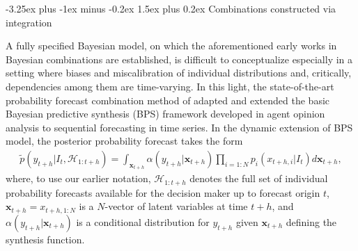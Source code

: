 \documentclass[11pt]{article}
\makeatletter
\renewcommand{\paragraph}{\@startsection{paragraph}{4}{0ex}%
   {-3.25ex plus -1ex minus -0.2ex}%
   {1.5ex plus 0.2ex}%
   {\normalfont\normalsize\bfseries}}
\makeatother
\begin{document}
\paragraph{Combinations constructed via integration}

A fully specified Bayesian model, on which the aforementioned early works in Bayesian combinations are established, is difficult to conceptualize especially in a setting where biases and miscalibration of individual distributions and, critically, dependencies among them are time-varying. In this light, the state-of-the-art probability forecast combination method of \citet{McAlinn2019-kn} adapted and extended the basic Bayesian predictive synthesis (BPS) framework developed in agent opinion analysis \citep[see, e.g.,][]{Genest1985-bu,West1992-qy,West1992-gr} to sequential forecasting in time series. In the dynamic extension of BPS model, the posterior probability forecast takes the form
\begin{align*}
\tilde{p}\left(y_{t+h} | I_{t}, \mathcal{H}_{1: t+h}\right) = \int_{\boldsymbol{x}_{t+h}} \alpha\left(y_{t+h} | \boldsymbol{x}_{t+h}\right) \prod_{i=1: N} p_{i}\left(x_{t+h,i}|I_{t}\right) d \boldsymbol{x}_{t+h},
\end{align*}
where, to use our earlier notation, $\mathcal{H}_{1: t+h}$ denotes the full set of individual probability forecasts available for the decision maker up to forecast origin $t$, $\boldsymbol{x}_{t+h} = x_{t+h, 1:N}$ is a $N$-vector of latent variables at time $t+h$, and $\alpha\left(y_{t+h} | \boldsymbol{x}_{t+h}\right)$ is a conditional distribution for $y_{t+h}$ given $\boldsymbol{x}_{t+h}$ defining the synthesis function.
\end{document}
